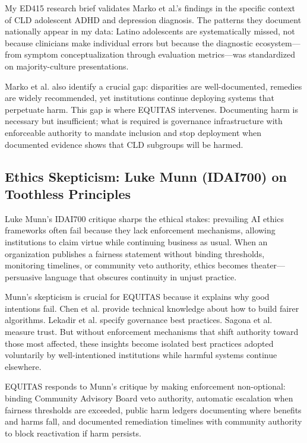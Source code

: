 \documentclass[12pt,a4paper]{article}
\begin{document}
My ED415 research brief validates Marko et al.'s findings in the specific context of CLD adolescent ADHD and depression diagnosis.\cite{garcia_ed415} The patterns they document nationally appear in my data: Latino adolescents are systematically missed, not because clinicians make individual errors but because the diagnostic ecosystem—from symptom conceptualization through evaluation metrics—was standardized on majority-culture presentations.\cite{marko2025}

Marko et al. also identify a crucial gap: disparities are well-documented, remedies are widely recommended, yet institutions continue deploying systems that perpetuate harm.\cite{marko2025} This gap is where EQUITAS intervenes. Documenting harm is necessary but insufficient; what is required is governance infrastructure with enforceable authority to mandate inclusion and stop deployment when documented evidence shows that CLD subgroups will be harmed.\cite{marko2025}

\subsection{Ethics Skepticism: Luke Munn (IDAI700) on Toothless Principles}

Luke Munn's IDAI700 critique sharps the ethical stakes: prevailing AI ethics frameworks often fail because they lack enforcement mechanisms, allowing institutions to claim virtue while continuing business as usual.\cite{munn_idai700} When an organization publishes a fairness statement without binding thresholds, monitoring timelines, or community veto authority, ethics becomes theater—persuasive language that obscures continuity in unjust practice.\cite{munn_idai700}

Munn's skepticism is crucial for EQUITAS because it explains why good intentions fail. Chen et al. provide technical knowledge about how to build fairer algorithms. Lekadir et al. specify governance best practices. Sagona et al. measure trust. But without enforcement mechanisms that shift authority toward those most affected, these insights become isolated best practices adopted voluntarily by well-intentioned institutions while harmful systems continue elsewhere.\cite{munn_idai700}

EQUITAS responds to Munn's critique by making enforcement non-optional: binding Community Advisory Board veto authority, automatic escalation when fairness thresholds are exceeded, public harm ledgers documenting where benefits and harms fall, and documented remediation timelines with community authority to block reactivation if harm persists.\cite{munn_idai700}
\end{document}
